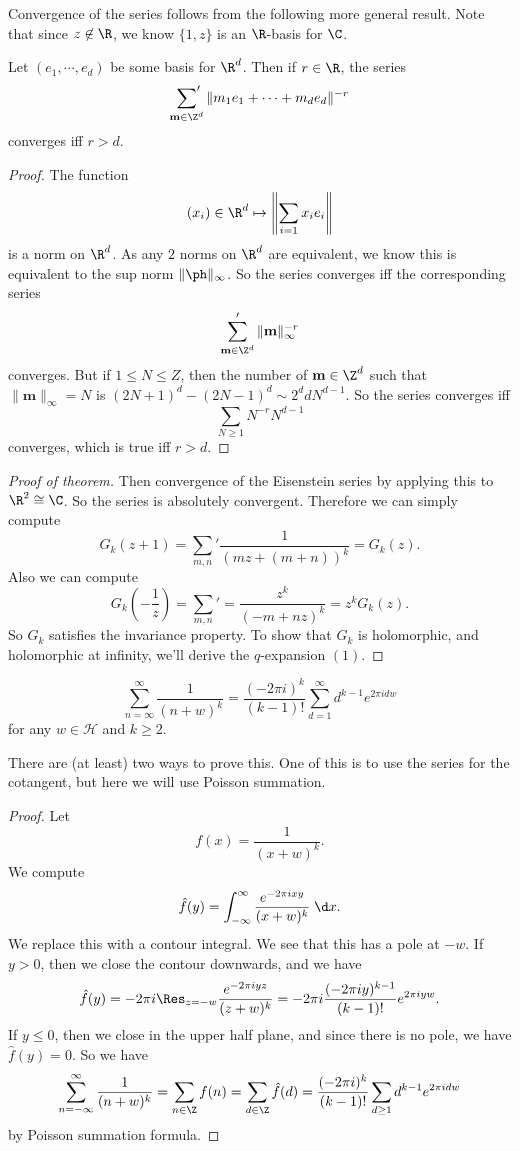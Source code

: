 \documentclass[a4paper]{article}
\renewcommand{\H}{\mathcal{H}}
\begin{document}
Convergence of the series follows from the following more general result. Note that since $z \not \in \R$, we know $\{1, z\}$ is an $\R$-basis for $\C$.
\begin{prop}
  Let $(e_1, \cdots, e_d)$ be some basis for $\R^d$. Then if $r \in \R$, the series
  \[
    \sideset{}{'}\sum_{\mathbf{m} \in \Z^d} \|m_1 e_1 + \cdots + m_d e_d\|^{-r}
  \]
  converges iff $r > d$.
\end{prop}

\begin{proof}
  The function
  \[
    (x_i) \in \R^d \mapsto \left\|\sum_{i = 1} x_i e_i \right\|
  \]
  is a norm on $\R^d$. As any $2$ norms on $\R^d$ are equivalent, we know this is equivalent to the sup norm $\|\ph\|_\infty$. So the series converges iff the corresponding series
  \[
    \sum_{\mathbf{m} \in \Z^d}' \|\mathbf{m}\|_\infty^{-r}
  \]
  converges. But if $1 \leq N \leq Z$, then the number of $\mathbf{m} \in \Z^d$ such that $\|\mathbf{m}\|_\infty = N$ is $(2N + 1)^d - (2N - 1)^d \sim 2^d d N^{d - 1}$. So the series converges iff
  \[
    \sum_{N \geq 1} N^{-r} N^{d - 1}
  \]
  converges, which is true iff $r > d$.
\end{proof}

\begin{proof}[Proof of theorem]
  Then convergence of the Eisenstein series by applying this to $\R^2 \cong \C$. So the series is absolutely convergent. Therefore we can simply compute
  \[
    G_k(z + 1) = \sum_{m, n}' \frac{1}{(mz + (m + n))^k} = G_k(z).
  \]
  Also we can compute
  \[
    G_k\left(-\frac{1}{z}\right) = \sum_{m, n}' = \frac{z^k}{(-m + nz)^k} = z^k G_k(z).
  \]
  So $G_k$ satisfies the invariance property. To show that $G_k$ is holomorphic, and holomorphic at infinity, we'll derive the $q$-expansion $(1)$.
\end{proof}

\begin{lemma}
  \[
    \sum_{n = \infty}^\infty \frac{1}{(n + w)^k} = \frac{(-2\pi i)^k}{(k - 1)!} \sum_{d = 1}^\infty d^{k - 1} e^{2\pi i d w}
  \]
  for any $w \in \H$ and $k \geq 2$.
\end{lemma}
There are (at least) two ways to prove this. One of this is to use the series for the cotangent, but here we will use Poisson summation.

\begin{proof}
  Let
  \[
    f(x) = \frac{1}{(x + w)^k}.
  \]
  We compute
  \[
    \hat{f}(y) = \int_{-\infty}^\infty \frac{e^{-2\pi i x y}}{(x + w)^k}\;\d x.
  \]
  We replace this with a contour integral. We see that this has a pole at $-w$. If $y > 0$, then we close the contour downwards, and we have
  \[
    \hat{f}(y) = -2\pi i \Res_{z = -w} \frac{e^{-2\pi i y z}}{(z + w)^k} = -2\pi i \frac{(-2\pi i y)^{k - 1}}{(k - 1)!} e^{2\pi i yw}.
  \]
  If $y \leq 0$, then we close in the upper half plane, and since there is no pole, we have $\hat{f}(y) = 0$. So we have
  \[
    \sum_{n = -\infty}^\infty \frac{1}{(n + w)^k} = \sum_{n \in \Z} f(n) = \sum_{d \in \Z} \hat{f}(d) = \frac{(-2\pi i)^k}{(k - 1)!} \sum_{d \geq 1} d^{k - 1} e^{2\pi i d w}
  \]
  by Poisson summation formula.
\end{proof}
\end{document}
